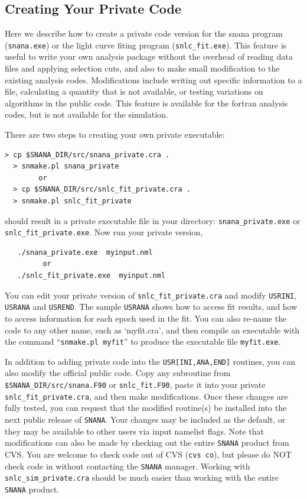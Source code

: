 \documentclass[12pt]{article}
\begin{document}
   \subsection{Creating Your Private Code }
   \label{subsec:private_fitter}

Here we describe how to create a private code version for
the snana program ({\tt snana.exe}) or the light curve fiting
program ({\tt snlc\_fit.exe}). This feature is useful to write your
own analysis package without the overhead of 
reading data files and applying selection cuts,
and also to make small modification to the existing analysis codes.
Modifications include writing out specific information to a file, 
calculating a quantity that is not available,
or testing variations on algorithms in the public code.
This feature is available for the fortran analysis codes,
but is not available for the simulation.

There are two steps to creating your own private executable:
%
\begin{Verbatim}[frame=single]
  > cp $SNANA_DIR/src/snana_private.cra .
  > snmake.pl snana_private
        or
  > cp $SNANA_DIR/src/snlc_fit_private.cra .
  > snmake.pl snlc_fit_private
\end{Verbatim}
%
should result in a private executable file in your directory:
{\tt snana\_private.exe} or {\tt snlc\_fit\_private.exe}.
Now run your private version, 
%
\begin{verbatim}
   ./snana_private.exe  myinput.nml
         or
   ./snlc_fit_private.exe  myinput.nml
\end{verbatim}
%
You can edit your private version of {\tt snlc\_fit\_private.cra}
and modify {\tt USRINI}, {\tt USRANA} and {\tt USREND}.
The sample {\tt USRANA} shows how to access fit results,
and how to access information for each epoch used in
the fit.
You can also re-name the code to any other name, 
such as `myfit.cra', and then compile an executable
with the command ``{\tt snmake.pl myfit}'' to produce
the executable file {\tt myfit.exe}.


In addition to adding private code into the {\tt USR[INI,ANA,END]}
routines, you can also modify the official public code. 
Copy any subroutine from {\tt \$SNANA\_DIR/src/snana.F90} or 
{\tt snlc\_fit.F90},
paste it into your private {\tt snlc\_fit\_private.cra},
and then make modifications. Once these changes are fully tested,
you can request that the modified routine(s) be installed into
the next public release of {\tt SNANA}. Your changes may be
included as the default, or they may be available to other 
users via input namelist flags.
Note that modifications can also be made by checking out
the entire {\tt SNANA} product from CVS.
You are welcome to check code out of CVS ({\tt cvs co}),
but please do NOT check code in without contacting
the {\tt SNANA} manager.  Working with {\tt snlc\_sim\_private.cra}
should be much easier than working with the entire {\tt SNANA} product.
\end{document}
